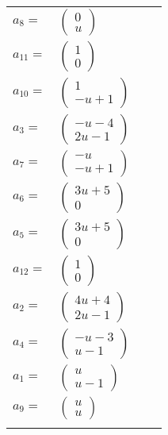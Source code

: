 \documentclass[1p]{elsarticle_modified}
\theoremstyle{definition}
\begin{document}
\begin{tabular}{m{7pt} m{180pt} m{7pt} m{180pt} }
\flushright $a_{8}=$&$\begin{pmatrix}0\\u\end{pmatrix}$ \\
\flushright $a_{11}=$&$\begin{pmatrix}1\\0\end{pmatrix}$ \\
\flushright $a_{10}=$&$\begin{pmatrix}1\\- u+1\end{pmatrix}$ \\
\flushright $a_{3}=$&$\begin{pmatrix}- u-4\\2 u-1\end{pmatrix}$ \\
\flushright $a_{7}=$&$\begin{pmatrix}- u\\- u+1\end{pmatrix}$ \\
\flushright $a_{6}=$&$\begin{pmatrix}3 u+5\\0\end{pmatrix}$ \\
\flushright $a_{5}=$&$\begin{pmatrix}3 u+5\\0\end{pmatrix}$ \\
\flushright $a_{12}=$&$\begin{pmatrix}1\\0\end{pmatrix}$ \\
\flushright $a_{2}=$&$\begin{pmatrix}4 u+4\\2 u-1\end{pmatrix}$ \\
\flushright $a_{4}=$&$\begin{pmatrix}- u-3\\u-1\end{pmatrix}$ \\
\flushright $a_{1}=$&$\begin{pmatrix}u\\u-1\end{pmatrix}$ \\
\flushright $a_{9}=$&$\begin{pmatrix}u\\u\end{pmatrix}$\\&\end{tabular}
\end{document}
